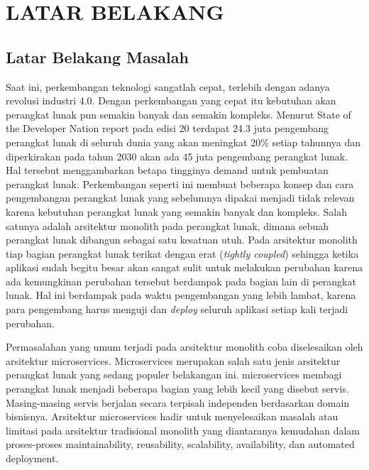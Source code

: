 
\chapter{LATAR BELAKANG}

\section{Latar Belakang Masalah}
Saat ini, perkembangan teknologi sangatlah cepat, terlebih dengan adanya revolusi industri 4.0. Dengan perkembangan yang cepat itu kebutuhan akan perangkat lunak pun semakin banyak dan semakin kompleks. Menurut State of the Developer Nation report pada edisi 20 terdapat 24.3 juta pengembang perangkat lunak di seluruh dunia yang akan meningkat 20\% setiap tahunnya dan diperkirakan pada tahun 2030 akan ada 45 juta pengembang perangkat lunak\cite{DeveloperReport}. Hal tersebut menggambarkan betapa tingginya demand untuk pembuatan perangkat lunak. Perkembangan seperti ini membuat beberapa konsep dan cara pengembangan perangkat lunak yang sebelumnya dipakai menjadi tidak relevan karena kebutuhan perangkat lunak yang semakin banyak dan kompleks. Salah satunya adalah arsitektur monolith pada perangkat lunak, dimana sebuah perangkat lunak dibangun sebagai satu kesatuan utuh. Pada arsitektur monolith tiap bagian perangkat lunak terikat dengan erat (\emph{tightly coupled}) sehingga ketika aplikasi sudah begitu besar akan sangat sulit untuk melakukan perubahan karena ada kemungkinan perubahan tersebut berdampak pada bagian lain di perangkat lunak. Hal ini berdampak pada waktu pengembangan yang lebih lambat, karena para pengembang harus menguji dan \emph{deploy} seluruh aplikasi setiap kali terjadi perubahan.

Permasalahan yang umum terjadi pada arsitektur monolith coba diselesaikan oleh arsitektur microservices. Microservices merupakan salah satu jenis arsitektur perangkat lunak yang sedang populer belakangan ini. microservices membagi perangkat lunak menjadi beberapa bagian yang lebih kecil yang disebut servis. Masing-masing servis berjalan secara terpisah independen berdasarkan domain bisnisnya. Arsitektur microservices hadir untuk menyelesaikan masalah atau limitasi pada arsitektur tradisional monolith yang diantaranya kemudahan dalam proses-proses maintainability, reusability, scalability, availability, dan automated deployment.

